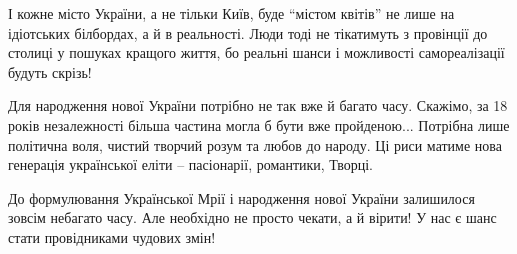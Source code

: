 \begin{multicols}{2}
І кожне місто України, а не тільки Київ, буде \enquote{містом квітів} не лише на
ідіотських білбордах, а й в реальності. Люди тоді не тікатимуть з провінції до
столиці у пошуках кращого життя, бо реальні шанси і можливості самореалізації
будуть скрізь!


Для народження нової України потрібно не так вже й багато часу. Скажімо, за 18
років незалежності більша частина могла б бути вже пройденою... Потрібна лише
політична воля, чистий творчий розум та любов до народу. Ці риси матиме нова
генерація української еліти – пасіонарії, романтики, Творці.

До формулювання Української Мрії і народження нової України залишилося зовсім
небагато часу. Але необхідно не просто чекати, а й вірити! У нас є шанс стати
провідниками чудових змін!

\end{multicols}
